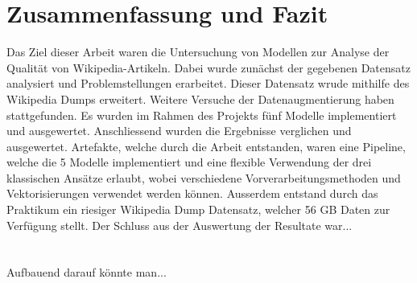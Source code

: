 \section{Zusammenfassung und Fazit}
\label{ZusammenfassungUndFazit}
Das Ziel dieser Arbeit waren die Untersuchung von Modellen zur Analyse der Qualität von Wikipedia-Artikeln. Dabei wurde zunächst der gegebenen Datensatz analysiert und Problemstellungen erarbeitet. Dieser Datensatz wrude mithilfe des Wikipedia Dumps erweitert. Weitere Versuche der Datenaugmentierung haben stattgefunden. Es wurden im Rahmen des Projekts fünf Modelle implementiert und ausgewertet. Anschliessend wurden die Ergebnisse verglichen und ausgewertet. Artefakte, welche durch die Arbeit entstanden, waren eine Pipeline, welche die 5 Modelle implementiert und eine flexible Verwendung der drei klassischen Ansätze erlaubt, wobei verschiedene Vorverarbeitungsmethoden und Vektorisierungen verwendet werden können. Ausserdem entstand durch das Praktikum ein riesiger Wikipedia Dump Datensatz, welcher 56 GB Daten zur Verfügung stellt.
Der Schluss aus der Auswertung der Resultate war... 
\\
\\
\\
Aufbauend darauf könnte man...